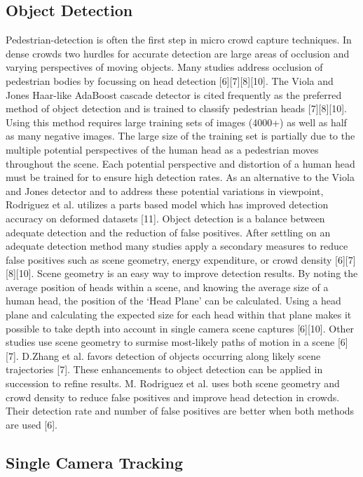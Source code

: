 \documentclass[conference]{IEEEtran}
\begin{document}
\subsection{Object Detection}

Pedestrian-detection is often the first step in micro crowd capture techniques. In dense crowds two hurdles for accurate detection are large areas of occlusion and varying perspectives of moving objects. Many studies address occlusion of pedestrian bodies by focussing on head detection [6][7][8][10]. The Viola and Jones Haar-like AdaBoost cascade detector is cited frequently as the preferred method of object detection and is trained to classify pedestrian heads [7][8][10]. Using this method requires large training sets of images (4000+) as well as half as many negative images. The large size of the training set is partially due to the multiple potential perspectives of the human head as a pedestrian moves throughout the scene. Each potential perspective and distortion of a human head must be trained for to ensure high detection rates. As an alternative to the Viola and Jones detector and to address these potential variations in viewpoint, Rodriguez et al. utilizes a parts based model which has improved detection accuracy on deformed datasets [11].
Object detection is a balance between adequate detection and the reduction of false positives. After settling on an adequate detection method many studies apply a secondary measures to reduce false positives such as scene geometry, energy expenditure, or crowd density [6][7][8][10]. Scene geometry is an easy way to improve detection results. By noting the average position of heads within a scene, and knowing the average size of a human head, the position of the ‘Head Plane’ can be calculated. Using a head plane and calculating the expected size for each head within that plane makes it possible to take depth into account in single camera scene captures [6][10].  Other studies use scene geometry to surmise most-likely paths of motion in a scene [6][7].  D.Zhang et al. favors detection of objects occurring along likely scene trajectories [7]. 
These enhancements to object detection can be applied in succession to refine results. M. Rodriguez et al. uses both scene geometry and crowd density to reduce false positives and improve head detection in crowds. Their detection rate and number of false positives are better when both methods are used [6]. 

\subsection{Single Camera Tracking}
\end{document}

